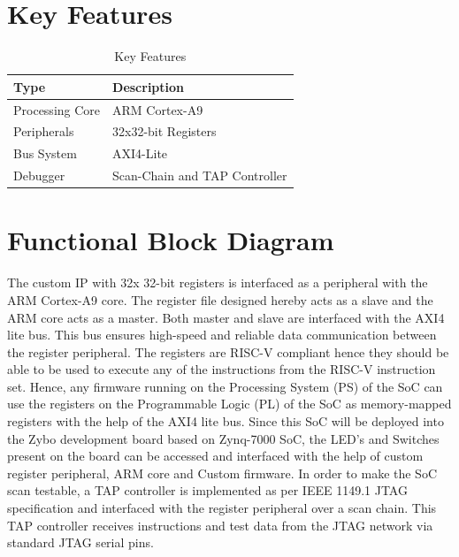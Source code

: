 \section{Key Features}
\begin{table}[H]
  \begin{center}
		\begin{tabular}{|p{3cm}|p{5cm}|}
			\hline
			\textbf{Type} & \hspace{10mm}\textbf{Description} \\
			\hline \hline
			Processing Core &  ARM Cortex-A9   \\
            \hline
			Peripherals & 32x32-bit Registers \\
			\hline
			Bus System & AXI4-Lite \\
			\hline
			Debugger & Scan-Chain and TAP Controller \\
			\hline
		\end{tabular}
		\caption{\label{demo-table} Key Features}
  \end{center}
	\end{table}

\section{Functional Block Diagram}
The custom IP with 32x 32-bit registers is interfaced as a peripheral with the ARM Cortex-A9 core. The register file designed hereby acts as a slave and the ARM core acts as a master. Both master and slave are interfaced with the AXI4 lite bus. This bus ensures high-speed and reliable data communication between the register peripheral. The registers are RISC-V compliant hence they should be able to be used to execute any of the instructions from the RISC-V instruction set.  Hence, any firmware running on the Processing System (PS) of the SoC can use the registers on the Programmable Logic (PL) of the SoC as memory-mapped registers with the help of the AXI4 lite bus. Since this SoC will be deployed into the Zybo development board based on Zynq-7000 SoC, the LED’s and Switches present on the board can be accessed and interfaced with the help of custom register peripheral, ARM core and Custom firmware. In order to make the SoC scan testable, a TAP controller is implemented as per IEEE 1149.1 JTAG specification and interfaced with the register peripheral over a scan chain. This TAP controller receives instructions and test data from the JTAG network via standard JTAG serial pins.
\vspace{3mm}
\vspace{-15pt} %

